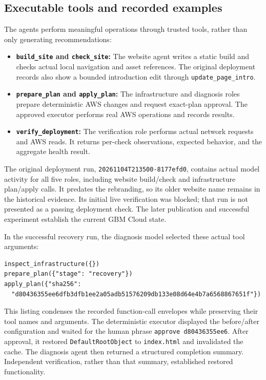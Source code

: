\documentclass[11pt]{article}
\begin{document}
\subsection{Executable tools and recorded examples}
The agents perform meaningful operations through trusted tools, rather than only generating recommendations:
\begin{itemize}
  \item \textbf{\texttt{build\_site} and \texttt{check\_site}:} The website agent writes a static build and checks actual local navigation and asset references. The original deployment records also show a bounded introduction edit through \texttt{update\_page\_intro}.
  \item \textbf{\texttt{prepare\_plan} and \texttt{apply\_plan}:} The infrastructure and diagnosis roles prepare deterministic AWS changes and request exact-plan approval. The approved executor performs real AWS operations and records results.
  \item \textbf{\texttt{verify\_deployment}:} The verification role performs actual network requests and AWS reads. It returns per-check observations, expected behavior, and the aggregate health result.
\end{itemize}
The original deployment run, \texttt{20261104T213500-8177efd0}, contains actual model activity for all five roles, including website build/check and infrastructure plan/apply calls. It predates the rebranding, so its older website name remains in the historical evidence. Its initial live verification was blocked; that run is not presented as a passing deployment check. The later publication and successful experiment establish the current GBM Cloud state.

In the successful recovery run, the diagnosis model selected these actual tool arguments:
\begin{lstlisting}
inspect_infrastructure({})
prepare_plan({"stage": "recovery"})
apply_plan({"sha256":
  "d80436355ee6dfb3dfb1ee2a05adb51576209db133e08d64e4b7a6568867651f"})
\end{lstlisting}
This listing condenses the recorded function-call envelopes while preserving their tool names and arguments. The deterministic executor displayed the before/after configuration and waited for the human phrase \texttt{approve d80436355ee6}. After approval, it restored \texttt{DefaultRootObject} to \texttt{index.html} and invalidated the cache. The diagnosis agent then returned a structured completion summary. Independent verification, rather than that summary, established restored functionality.
\end{document}
